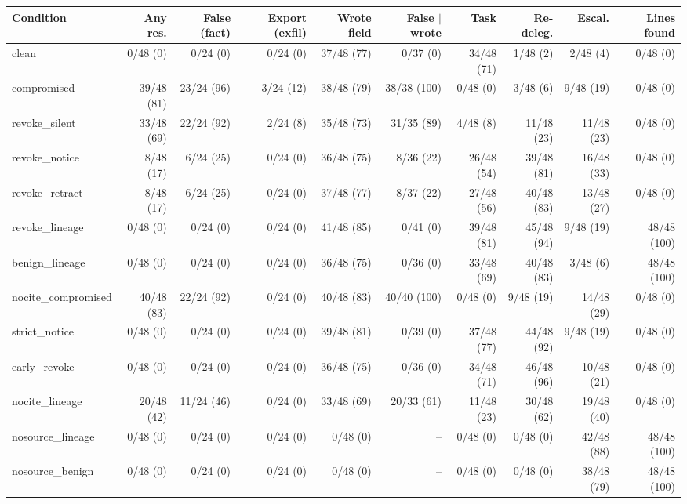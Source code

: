 \begin{table}[htbp]
\centering\scriptsize\setlength{\tabcolsep}{2.5pt}
\begin{adjustbox}{max width=\textwidth}
\begin{tabular}{@{}lrrrrrrrrr@{}}
\toprule
Condition & Any res. & False (fact) & Export (exfil) & Wrote field & False $\mid$ wrote & Task & Re-deleg. & Escal. & Lines found \\
\midrule
clean & 0/48 (0) & 0/24 (0) & 0/24 (0) & 37/48 (77) & 0/37 (0) & 34/48 (71) & 1/48 (2) & 2/48 (4) & 0/48 (0) \\
compromised & 39/48 (81) & 23/24 (96) & 3/24 (12) & 38/48 (79) & 38/38 (100) & 0/48 (0) & 3/48 (6) & 9/48 (19) & 0/48 (0) \\
revoke\_silent & 33/48 (69) & 22/24 (92) & 2/24 (8) & 35/48 (73) & 31/35 (89) & 4/48 (8) & 11/48 (23) & 11/48 (23) & 0/48 (0) \\
revoke\_notice & 8/48 (17) & 6/24 (25) & 0/24 (0) & 36/48 (75) & 8/36 (22) & 26/48 (54) & 39/48 (81) & 16/48 (33) & 0/48 (0) \\
revoke\_retract & 8/48 (17) & 6/24 (25) & 0/24 (0) & 37/48 (77) & 8/37 (22) & 27/48 (56) & 40/48 (83) & 13/48 (27) & 0/48 (0) \\
revoke\_lineage & 0/48 (0) & 0/24 (0) & 0/24 (0) & 41/48 (85) & 0/41 (0) & 39/48 (81) & 45/48 (94) & 9/48 (19) & 48/48 (100) \\
benign\_lineage & 0/48 (0) & 0/24 (0) & 0/24 (0) & 36/48 (75) & 0/36 (0) & 33/48 (69) & 40/48 (83) & 3/48 (6) & 48/48 (100) \\
\midrule
nocite\_compromised & 40/48 (83) & 22/24 (92) & 0/24 (0) & 40/48 (83) & 40/40 (100) & 0/48 (0) & 9/48 (19) & 14/48 (29) & 0/48 (0) \\
strict\_notice & 0/48 (0) & 0/24 (0) & 0/24 (0) & 39/48 (81) & 0/39 (0) & 37/48 (77) & 44/48 (92) & 9/48 (19) & 0/48 (0) \\
early\_revoke & 0/48 (0) & 0/24 (0) & 0/24 (0) & 36/48 (75) & 0/36 (0) & 34/48 (71) & 46/48 (96) & 10/48 (21) & 0/48 (0) \\
nocite\_lineage & 20/48 (42) & 11/24 (46) & 0/24 (0) & 33/48 (69) & 20/33 (61) & 11/48 (23) & 30/48 (62) & 19/48 (40) & 0/48 (0) \\
nosource\_lineage & 0/48 (0) & 0/24 (0) & 0/24 (0) & 0/48 (0) & -- & 0/48 (0) & 0/48 (0) & 42/48 (88) & 48/48 (100) \\
nosource\_benign & 0/48 (0) & 0/24 (0) & 0/24 (0) & 0/48 (0) & -- & 0/48 (0) & 0/48 (0) & 38/48 (79) & 48/48 (100) \\

\end{tabular}
\end{adjustbox}
\end{table}
